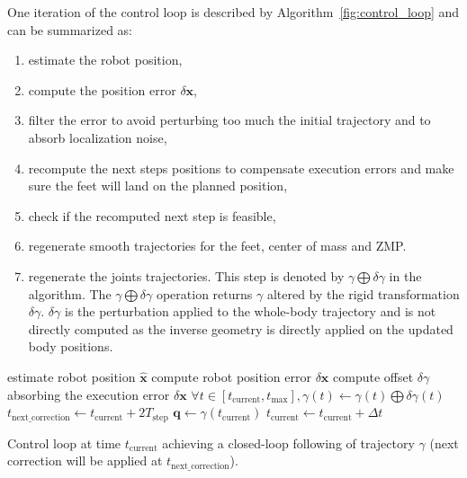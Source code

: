 One iteration of the control loop is described by
Algorithm~\ref{fig:control_loop} and can be summarized as:
\begin{enumerate}
\item estimate the robot position,
\item compute the position error \mbox{$\delta \mathbf{x}$},
\item filter the error to avoid perturbing too much the initial
  trajectory and to absorb localization noise,
\item recompute the next steps positions to compensate execution
  errors and make sure the feet will land on the planned position,
\item check if the recomputed next step is feasible,
\item regenerate smooth trajectories for the feet, center of mass and
  ZMP.
\item regenerate the joints trajectories. This step is denoted by
  \mbox{$\gamma \bigoplus \delta \gamma$} in the algorithm. The
  \mbox{$\gamma \bigoplus \delta \gamma$} operation returns $\gamma$
  altered by the rigid transformation \mbox{$\delta \gamma$}. $\delta
  \gamma$ is the perturbation applied to the whole-body trajectory and
  is not directly computed as the inverse geometry is directly applied
  on the updated body positions.
\end{enumerate}


\begin{algorithm}
  \begin{algorithmic}
    \STATE estimate robot position $\mathbf{\hat{x}}$
    \STATE compute robot position error $\delta \mathbf{x}$
    \STATE compute offset $\delta \gamma$ absorbing the execution
    error $\delta \mathbf{x}$
    \STATE $\forall t \in [t_{\text{current}}, t_{\text{max}}],
    \gamma(t) \leftarrow \gamma(t) \bigoplus \delta \gamma(t)$
    \STATE $t_{\text{next\_correction}} \leftarrow t_{\text{current}} + 2 T_{\text{step}}$
    \ENDIF
    \ENDIF
    \STATE $\mathbf{q} \leftarrow \gamma(t_{\text{current}})$
    \STATE $t_{\text{current}} \leftarrow t_{\text{current}} + \Delta t$
  \end{algorithmic}
  \caption{Control loop at time $t_{\text{current}}$ achieving a
    closed-loop following of trajectory $\gamma$ (next correction will
    be applied at
    $t_{\text{next\_correction}}$). \label{fig:control_loop}}
\end{algorithm}


